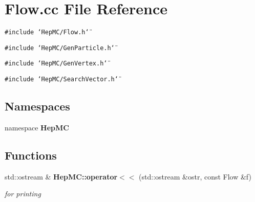 \section{Flow.cc File Reference}
\label{Flow_8cc}
{\tt \#include \char`\"{}Hep\-MC/Flow.h\char`\"{}}\par
{\tt \#include \char`\"{}Hep\-MC/Gen\-Particle.h\char`\"{}}\par
{\tt \#include \char`\"{}Hep\-MC/Gen\-Vertex.h\char`\"{}}\par
{\tt \#include \char`\"{}Hep\-MC/Search\-Vector.h\char`\"{}}\par
\subsection*{Namespaces}
\begin{CompactItemize}
\item 
namespace {\bf Hep\-MC}
\end{CompactItemize}
\subsection*{Functions}
\begin{CompactItemize}
\item 
std::ostream \& {\bf Hep\-MC::operator$<$$<$} (std::ostream \&ostr, const Flow \&f)
\begin{CompactList}\small\item\em for printing \item\end{CompactList}\end{CompactItemize}
